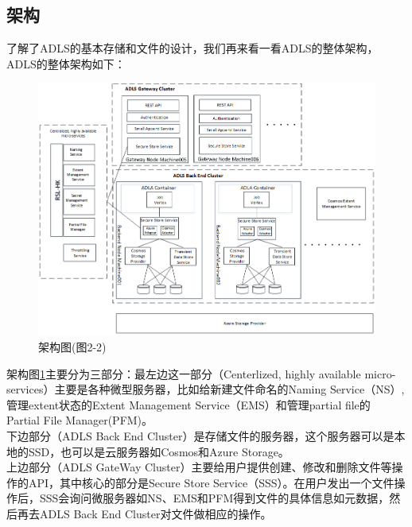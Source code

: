 \documentclass[11pt]{article}
\begin{document}
\subsection{架构}
了解了ADLS的基本存储和文件的设计，我们再来看一看ADLS的整体架构，ADLS的整体架构如下：
\begin{figure}[H]
\includegraphics[width=\linewidth]{figs/ADLS-arc.png}
\caption{架构图(\cite{ramakrishnan2017azure}图2-2)}
\label{fig:ADLS-arc}
\end{figure}
架构图\ref{fig:ADLS-arc}主要分为三部分：最左边这一部分（Centerlized, highly available micro-services）主要是各种微型服务器，比如给新建文件命名的Naming Service（NS）, 管理extent状态的Extent Management Service（EMS）和管理partial file的 Partial File Manager(PFM)。\\
下边部分（ADLS Back End Cluster）是存储文件的服务器，这个服务器可以是本地的SSD，也可以是云服务器如Cosmos和Azure Storage。\\
上边部分（ADLS GateWay Cluster）主要给用户提供创建、修改和删除文件等操作的API，其中核心的部分是Secure Store Service（SSS）。在用户发出一个文件操作后，SSS会询问微服务器如NS、EMS和PFM得到文件的具体信息如元数据，然后再去ADLS Back End Cluster对文件做相应的操作。
\end{document}
